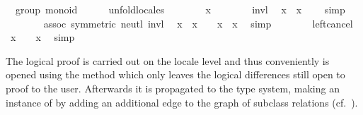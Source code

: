 \begin{isabellebody}
\ {\isacharparenleft}\ group{\isacharparenright}\ monoid\isanewline
%
\isadelimproof
\ \ \ \ %
\endisadelimproof
%
\isatagproof
{}\isamarkupfalse%
\ unfold{\isacharunderscore}locales\isanewline
\ \ \ \ \ \ \isamarkupfalse%
\ x\isanewline
\ \ \ \ \ \ \isamarkupfalse%
\ invl\ \isamarkupfalse%
\ {\isachardoublequoteopen}x{\isasymdiv}\ {\isasymotimes}\ x\ {\isacharequal}\ {\isasymone}{\isachardoublequoteclose}\ \isamarkupfalse%
\ simp\isanewline
\ \ \ \ \ \ \isamarkupfalse%
\ assoc\ {\isacharbrackleft}symmetric{\isacharbrackright}\ neutl\ invl\ \isamarkupfalse%
\ {\isachardoublequoteopen}x{\isasymdiv}\ {\isasymotimes}\ {\isacharparenleft}x\ {\isasymotimes}\ {\isasymone}{\isacharparenright}\ {\isacharequal}\ x{\isasymdiv}\ {\isasymotimes}\ x{\isachardoublequoteclose}\ \isamarkupfalse%
\ simp\isanewline
\ \ \ \ \ \ \isamarkupfalse%
\ left{\isacharunderscore}cancel\ \isamarkupfalse%
\ {\isachardoublequoteopen}x\ {\isasymotimes}\ {\isasymone}\ {\isacharequal}\ x{\isachardoublequoteclose}\ \isamarkupfalse%
\ simp\isanewline
\ \ \ \ \isamarkupfalse%
%
\endisatagproof
{\isafoldproof}%
%
\isadelimproof
%
\endisadelimproof
%
\begin{isamarkuptext}%
\noindent The logical proof is carried out on the locale level
  and thus conveniently is opened using the 
  method which only leaves the logical differences still
  open to proof to the user.  Afterwards it is propagated
  to the type system, making  an instance of
   by adding an additional edge
  to the graph of subclass relations
  (cf.\ ).


\end{isamarkuptext}
\end{isabellebody}
